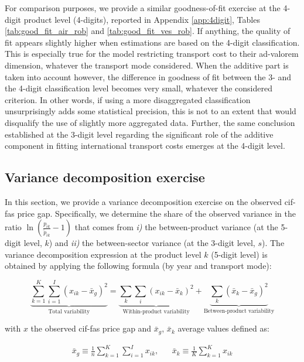 \documentclass[a4paper,11pt]{article}
\begin{document}
For comparison purposes, we provide a similar goodness-of-fit exercise at the 4-digit product level (4-digits), reported in Appendix \ref{app:4digit}, Tables \ref{tab:good_fit_air_rob} and \ref{tab:good_fit_ves_rob}.
If anything, the quality of fit appears slightly higher when estimations are based on the 4-digit classification.
This is especially true for the model restricting transport cost to their ad-valorem dimension, whatever the transport mode considered.
When the additive part is taken into account however, the difference in goodness of fit between the 3- and the 4-digit classification level becomes very small, whatever the considered criterion.
In other words, if using a more disaggregated classification unsurprisingly adds some statistical precision, this is not to an extent that would disqualify the use of slightly more aggregated data.
Further, the same conclusion established at the 3-digit level regarding the significant role of the additive component in fitting international transport costs emerges at the 4-digit level.



\subsection{Variance decomposition exercise \label{app:decomp_variance}}

In this section, we provide a variance decomposition exercise on the observed cif-fas price gap.
Specifically, we determine the share of the observed variance in the ratio $\ln(\frac{p_{ik}}{\widetilde{p}_{ik}}-1)$ that comes from \textit{i)} the between-product variance (at the 5-digit level, $k$) and \textit{ii)} the between-sector variance (at the 3-digit level, $s$).
The variance decomposition expression at the product level $k$ (5-digit level) is obtained by applying the following formula (by year and transport mode):

$$\underbrace{\sum_{k=1}^K \sum_{i=1}^I \left(x_{ik} - \bar{x}_g  \right)^2}_{\text{Total variability}} = \underbrace{\sum_k \sum_i \left(x_{ik} - \bar{x}_k  \right)^2}_{\text{Within-product variability}} + \underbrace{\sum_k \left(\bar{x}_{k} - \bar{x}_g  \right)^2}_{\text{Between-product variability}}$$

with $x$ the observed cif-fas price gap and $\bar{x}_g$, $\bar{x}_k$ average values defined as:

\begin{eqnarray*}
\bar{x}_g \equiv \frac{1}{n} \sum_{k=1}^K \sum_{i=1}^I x_{ik},&& \bar{x}_k \equiv \frac{1}{K}\sum_{k=1}^K x_{ik}
\end{eqnarray*}
\end{document}
